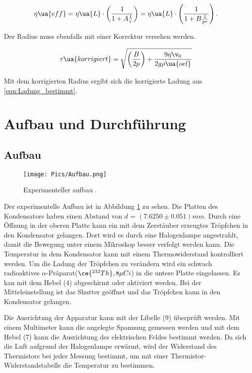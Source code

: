 \begin{align}
  \eta\ua{eff} = \eta\ua{L}  \cdot \left( \frac{1}{1 + A\frac{1}{r}} \right) = \eta\ua{L} \cdot \left( \frac{1}{1 + B\frac{1}{pr}} \right).
  \label{eqn:Viskosität_korrigiert}
\end{align}


Der Radius muss ebenfalls mit einer Korrektur versehen werden.

\begin{align}
  r\ua{korrigiert} = \sqrt{\left(\frac{B}{2p}\right) + \frac{9\eta\v_0}{2g\rho\ua{oel}}}
  \label{eqn:Ladung_korrigiert}
\end{align}

Mit dem korrigierten Radius ergibt sich die korrigierte Ladung aus \eqref{eqn:Ladung_bestimmt}.

\section{Aufbau und Durchführung}

\subsection{Aufbau}

\begin{figure}
  \texttt{[image: Pics/Aufbau.png]}
  \caption{Experimenteller aufbau \cite{anleitung01}.}
  \label{fig:Aufbau}
\end{figure}

Der experimentelle Aufbau ist in Abbildung \ref{fig:Aufbau} zu sehen. Die Platten des
Kondensators haben einen Abstand von $d$ = $(7.6250 \pm 0.051)\si{mm}$. Durch eine
Öffnung in der oberen Platte kann ein mit dem Zerstäuber erzeugtes Tröpfchen in
den Kondensator gelangen. Dort wird es durch eine Halogenlampe angestrahlt, damit
die Bewegung unter einem Mikroskop besser verfolgt werden kann. Die Temperatur in
dem Kondensator kann mit einem Thermowiderstand kontrolliert werden. Um die Ladung
der Tröpfchen zu verändern wird ein schwach radioaktives $\alpha$-Präparat($\ce{^{232}Th},
8 \mu Ci$) in die untere Platte eingelassen. Es kan mit dem Hebel (4) abgeschirmt
oder aktiviert werden. Bei der Mitteleinstellung ist das Shutter geöffnet und das
Tröpfchen kann in den Kondensator gelangen.

Die Ausrichtung der Apparatur kann mit der Libelle (9) überprüft werden. Mit einem
Multimeter kann die angelegte Spannung gemessen werden und mit dem Hebel (7)
kann die Ausrichtung des elektrischen Feldes bestimmt werden. Da sich die Luft
aufgrund der Halogenlampe erwärmt, wird der Widerstand des Thermistors
bei jeder Messung bestimmt, um mit einer Thermistor-Widerstandstabelle die
Temperatur zu bestimmen.

